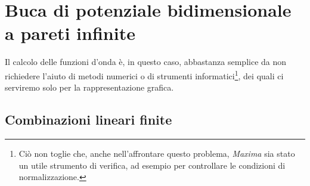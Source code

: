 {}
\section{Buca di potenziale bidimensionale a pareti infinite}

Il calcolo delle funzioni d'onda è, in questo caso, abbastanza 
semplice da non richiedere l'aiuto di metodi numerici
o di strumenti informatici\footnote{
  Ciò non toglie che, anche nell'affrontare questo problema,
  \emph{Maxima}\cite{MAXIMA} sia stato un utile strumento di verifica,
  ad esempio per controllare le condizioni di normalizzazione.
}, dei quali ci serviremo solo per la 
rappresentazione grafica.

%
 


\subsection{Combinazioni lineari finite}

